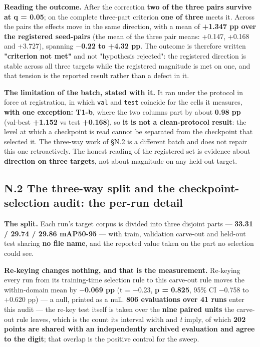\documentclass[pdflatex,sn-mathphys-ay]{sn-jnl}
\begin{document}
\textbf{Reading the outcome.} After the correction \textbf{two of the three pairs survive at q = 0.05}; on the complete three-part criterion \textbf{one of three} meets it. Across the pairs the effects move in the same direction, with a mean of \textbf{+1.347 pp over the registered seed-pairs} (the mean of the three pair means: +0.147, +0.168 and +3.727), spanning \textbf{\ensuremath{-}0.22 to +4.32 pp}. The outcome is therefore written \textbf{"criterion not met"} and not "hypothesis rejected": the registered direction is stable across all three targets while the registered magnitude is met on one, and that tension is the reported result rather than a defect in it.

\textbf{The limitation of the batch, stated with it.} It ran under the protocol in force at registration, in which \texttt{val} and \texttt{test} coincide for the cells it measures, \textbf{with one exception: T1-b}, where the two columns part by about \textbf{0.98 pp} (val-best \textbf{+1.152} vs test \textbf{+0.168}), so \textbf{it is not a clean-protocol result}: the level at which a checkpoint is read cannot be separated from the checkpoint that selected it. The three-way work of \S{}N.2 is a different batch and does not repair this one retroactively. The honest reading of the registered set is evidence about \textbf{direction on three targets}, not about magnitude on any held-out target.

\subsection*{N.2 The three-way split and the checkpoint-selection audit: the per-run detail}

\textbf{The split.} Each run's target corpus is divided into three disjoint parts --- \textbf{33.31 / 29.74 / 29.86 mAP50-95} --- with train, validation carve-out and held-out test sharing \textbf{no file name}, and the reported value taken on the part no selection could see.

\textbf{Re-keying changes nothing, and that is the measurement.} Re-keying every run from its training-time selection rule to this carve-out rule moves the within-domain mean by \textbf{\ensuremath{-}0.069 pp} (t = \ensuremath{-}0.23, \textbf{p = 0.825}, 95\% CI \ensuremath{-}0.758 to +0.620 pp) --- a null, printed as a null. \textbf{806 evaluations over 41 runs} enter this audit --- the re-key test itself is taken over the \textbf{nine paired units} the carve-out rule leaves, which is the count its interval width and \emph{t} imply, of which \textbf{202 points are shared with an independently archived evaluation and agree to the digit}; that overlap is the positive control for the sweep.
\end{document}
